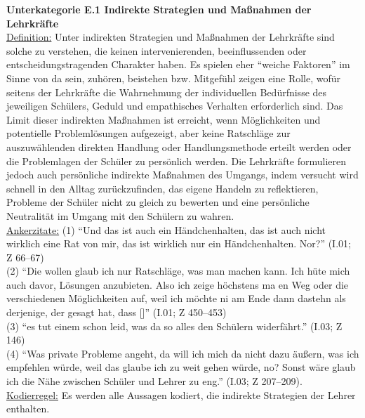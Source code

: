 \textbf{Unterkategorie E.1 Indirekte Strategien und Maßnahmen der Lehrkräfte}\\
\underline{Definition:} Unter indirekten Strategien und Maßnahmen der Lehrkräfte sind solche zu verstehen, die keinen intervenierenden, beeinflussenden oder entscheidungstragenden Charakter haben. Es spielen eher "`weiche Faktoren"' im Sinne von da sein, zuhören, beistehen bzw. Mitgefühl zeigen eine Rolle, wofür seitens der Lehrkräfte die Wahrnehmung der individuellen Bedürfnisse des jeweiligen Schülers, Geduld und empathisches Verhalten erforderlich sind. Das Limit dieser indirekten Maßnahmen ist erreicht, wenn Möglichkeiten und potentielle Problemlösungen aufgezeigt, aber keine Ratschläge zur auszuwählenden direkten Handlung oder Handlungsmethode erteilt werden oder die Problemlagen der Schüler zu persönlich werden. Die Lehrkräfte formulieren jedoch auch persönliche indirekte Maßnahmen des Umgangs, indem versucht wird schnell in den Alltag zurückzufinden, das eigene Handeln zu reflektieren, Probleme der Schüler nicht zu gleich zu bewerten und eine persönliche Neutralität im Umgang mit den Schülern zu wahren.\\
\underline{Ankerzitate:} (1) "`Und das ist auch ein Händchenhalten, das ist auch nicht wirklich eine Rat von mir, das ist wirklich nur ein Händchenhalten. Nor?"' (I.01; Z 66--67)\\ (2) "`Die wollen glaub ich nur Ratschläge, was man machen kann. Ich hüte mich auch davor, Lösungen anzubieten. Also ich zeige höchstens ma en Weg oder die verschiedenen Möglichkeiten auf, weil ich möchte ni am Ende dann dastehn als derjenige, der gesagt hat, dass [\punkte]"' (I.01; Z 450--453)\\ (3) "`es tut einem schon leid, was da so alles den Schülern widerfährt."' (I.03; Z 146)\\ (4) "`Was private Probleme angeht, da will ich mich da nicht dazu äußern, was ich empfehlen würde, weil das glaube ich zu weit gehen würde, no? Sonst wäre glaub ich die Nähe zwischen Schüler und Lehrer zu eng."' (I.03; Z 207--209).\\
\underline{Kodierregel:} Es werden alle Aussagen kodiert, die indirekte Strategien der Lehrer enthalten.\\

